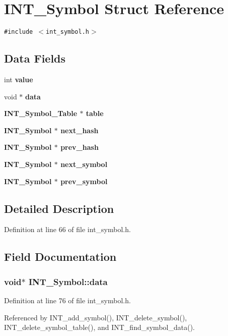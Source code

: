 \section{INT\_\-Symbol Struct Reference}
\label{structINT__Symbol}
{\tt \#include $<$int\_\-symbol.h$>$}

\subsection*{Data Fields}
\begin{CompactItemize}
\item 
int \bf{value}
\item 
void $\ast$ \bf{data}
\item 
\bf{INT\_\-Symbol\_\-Table} $\ast$ \bf{table}
\item 
\bf{INT\_\-Symbol} $\ast$ \bf{next\_\-hash}
\item 
\bf{INT\_\-Symbol} $\ast$ \bf{prev\_\-hash}
\item 
\bf{INT\_\-Symbol} $\ast$ \bf{next\_\-symbol}
\item 
\bf{INT\_\-Symbol} $\ast$ \bf{prev\_\-symbol}
\end{CompactItemize}


\subsection{Detailed Description}




Definition at line 66 of file int\_\-symbol.h.

\subsection{Field Documentation}
\subsubsection{\setlength{\rightskip}{0pt plus 5cm}void$\ast$ \bf{INT\_\-Symbol::data}}\label{structINT__Symbol_2158658fd3bec8e70b62a2c2c151ff03}




Definition at line 76 of file int\_\-symbol.h.

Referenced by INT\_\-add\_\-symbol(), INT\_\-delete\_\-symbol(), INT\_\-delete\_\-symbol\_\-table(), and INT\_\-find\_\-symbol\_\-data().
